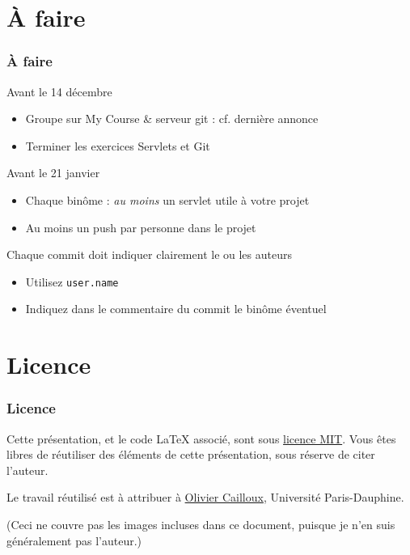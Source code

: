 \documentclass[english, french]{beamer}
\begin{document}
\section{À faire}
\begin{frame}
	\frametitle{À faire}
	\begin{block}{Avant le 14 décembre}
		\begin{itemize}
			\item Groupe sur My Course \& serveur git : cf. dernière annonce
			\item Terminer les exercices Servlets et Git
		\end{itemize}
	\end{block}
	\begin{block}{Avant le 21 janvier}
		\begin{itemize}
			\item[+\footnote{Le + indique que cet aspect intervient dans la note}] Chaque binôme : \emph{au moins} un servlet utile à votre projet
			\item[+] Au moins un push par personne dans le projet
		\end{itemize}
	\end{block}
	Chaque commit doit indiquer clairement le ou les auteurs
	\begin{itemize}
		\item Utilisez \texttt{user.name}
		\item Indiquez dans le commentaire du commit le binôme éventuel
	\end{itemize}
\end{frame}

\appendix
\AtBeginSection{
}
\section{Licence}
\begin{frame}
	\frametitle{Licence}
	Cette présentation, et le code LaTeX associé, sont sous \href{http://opensource.org/licenses/MIT}{licence MIT}. Vous êtes libres de réutiliser des éléments de cette présentation, sous réserve de citer l’auteur.
	
	Le travail réutilisé est à attribuer à \href{http://www.lamsade.dauphine.fr/~ocailloux/}{Olivier Cailloux}, Université Paris-Dauphine.
	
	\small{(Ceci ne couvre pas les images incluses dans ce document, puisque je n’en suis généralement pas l’auteur.)}
\end{frame}
\end{document}
